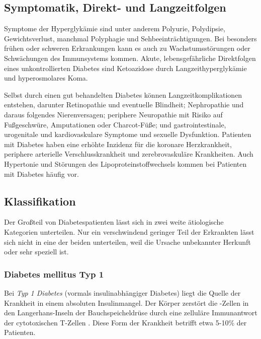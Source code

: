 \documentclass[11.5pt]{article}
\begin{document}
\subsection{Symptomatik, Direkt- und Langzeitfolgen}


Symptome der Hyperglykämie sind unter anderem Polyurie, Polydipsie, Gewichtsverlust, manchmal Polyphagie und Sehbeeinträchtigungen\footnotemark \cite[p.~62]{ada}. Bei besonders frühen oder schweren Erkrankungen kann es auch zu Wachstumsstörungen oder Schwächungen des Immunsystems kommen. Akute, lebensgefährliche Direktfolgen eines unkontrollierten Diabetes sind Ketoazidose durch Langzeithyperglykämie und hyperosmolares Koma\footnotemark[\value{footnote}] \cite[p.~540]{who}.


Selbst durch einen gut behandelten Diabetes können Langzeitkomplikationen entstehen, darunter Retinopathie und eventuelle Blindheit; Nephropathie und daraus folgendes Nierenversagen; periphere Neuropathie mit Risiko auf Fußgeschwüre, Amputationen oder Charcot-Füße; und gastrointestinale, urogenitale und kardiovaskulare Symptome und sexuelle Dysfunktion\footnotemark[\value{footnote}]. Patienten  mit Diabetes haben eine erhöhte Inzidenz für die koronare Herzkrankheit, periphere arterielle  Verschlusskrankheit und zerebrovaskuläre Krankheiten. Auch Hypertonie und Störungen des Lipoproteinstoffwechsels kommen bei Patienten mit Diabetes häufig vor\footnotemark[\value{footnote}]. \cite[p.~62]{ada}

\newpage


\subsection{Klassifikation}


Der Großteil von Diabetespatienten lässt sich in zwei weite ätiologische Kategorien unterteilen. Nur ein verschwindend geringer Teil der Erkrankten lässt sich nicht in eine der beiden unterteilen, weil die Ursache unbekannter Herkunft oder sehr speziell ist.

\subsubsection{Diabetes mellitus Typ 1}


Bei \textit{Typ 1 Diabetes} (vormals \glqq insulinabhängiger Diabetes\grqq{}) liegt die Quelle der Krankheit in einem absoluten Insulinmangel. Der Körper zerstört die \textbeta-Zellen in den Langerhans-Inseln der Bauchspeicheldrüse durch eine zelluläre Immunantwort der cytotoxischen T-Zellen \cite[p.~62]{ada}. Diese Form der Krankheit betrifft etwa 5-10\% der Patienten. 
\end{document}
